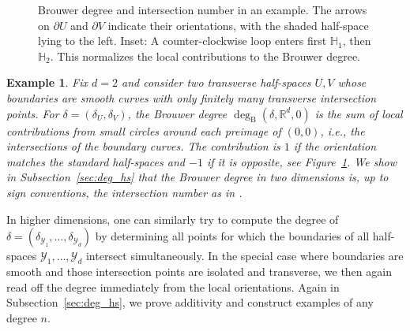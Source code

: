 \documentclass[12pt]{amsart}
\newtheorem{example}[theorem]{Example}
\newcommand{\RM}{{\mathbb R}}
\newcommand{\Yy}{{\mathcal Y}}
\newcommand{\pdv}{\partial}
\begin{document}
\begin{figure}[htbp]
{%
}

\caption{Brouwer degree and intersection number in an example. The arrows on
$\pdv U$ and $\pdv V$ indicate their orientations, with the shaded
half-space lying to the left. Inset: A counter-clockwise loop enters first
$\mathbb H_1$, then $\mathbb H_2$. This normalizes the local contributions to
the Brouwer degree.}
\label{fig:brouwer-degree-intersection}
\end{figure}

\begin{example}
\label{ex:intersections}
{\rm Fix $d=2$ and consider two transverse half-spaces $U,V$ whose boundaries are smooth curves with only finitely many transverse intersection points. For $\delta=(\delta_U,\delta_V)$, the Brouwer degree $\deg_{\mathrm B}(\delta, \RM^d, 0)$ is the sum of local contributions from small circles around each preimage of $(0,0)$, i.e., the intersections of the boundary curves. The contribution is $1$ if the orientation matches the standard half-spaces and $-1$ if it is opposite, see Figure~\ref{fig:brouwer-degree-intersection}. 
We show in Subsection~\ref{sec:deg_hs} that the Brouwer degree in two dimensions is, up to sign conventions, the intersection number as in \cite{drouot2024bulk}.}
\end{example}

In higher dimensions, one can similarly try to compute the degree of $\delta=(\delta_{\Yy_1},\ldots,\delta_{\Yy_d})$ by determining all points for which the boundaries of all half-spaces $\Yy_1,\ldots,\Yy_d$ intersect simultaneously. In the special case where boundaries are smooth and those intersection points are isolated and transverse, we then again read off the degree immediately from the local orientations. 
Again in Subsection~\ref{sec:deg_hs}, we prove additivity and construct examples of any degree $n$.
\end{document}
